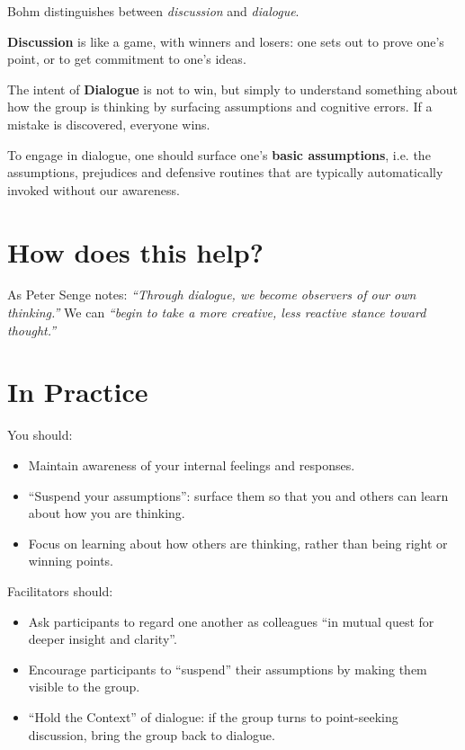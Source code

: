 \documentclass{article}
\newenvironment{nosepitemize}
{ \begin{itemize}
    \setlength{\itemsep}{0pt}
    \setlength{\parskip}{0pt}
    \setlength{\parsep}{0pt}     }
{ \end{itemize}                  }
\begin{document}
\begin{multicols}{2}

\noindent
Bohm distinguishes between \textit{discussion} and \textit{dialogue}.

\textbf{Discussion} is like a game, with winners and losers: one sets out to prove one's point, or to get commitment to one's ideas.

The intent of \textbf{Dialogue} is not to win, but simply to understand something about how the group is thinking by surfacing assumptions and cognitive errors. If a mistake is discovered, everyone wins.

To engage in dialogue, one should surface one's \textbf{basic assumptions}, i.e. the assumptions, prejudices and defensive routines  that are typically automatically invoked without our awareness.

\section{How does this help?}

As Peter Senge notes: \textit{“Through dialogue, we become observers of our own thinking.”} We can \textit{“begin to take a more creative, less reactive stance toward thought.”}

\section{In Practice}

You should:

\begin{nosepitemize}
    \item Maintain awareness of your internal feelings and responses.
    \item “Suspend your assumptions”: surface them so that you and others can learn about how you are thinking.
    \item Focus on learning about how others are thinking, rather than being right or winning points.
\end{nosepitemize}

\noindent
Facilitators should:

\begin{nosepitemize}
    \item Ask participants to regard one another as colleagues “in mutual quest for deeper insight and clarity”.
    \item Encourage participants to “suspend” their assumptions by making them visible to the group.
    \item “Hold the Context” of dialogue: if the group turns to point-seeking discussion, bring the group back to dialogue.
\end{nosepitemize}

\end{multicols}
\end{document}
